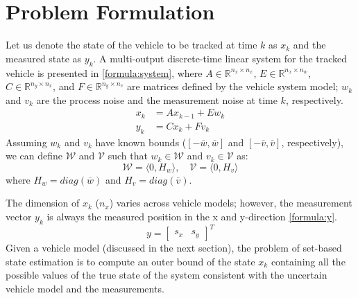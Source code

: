 \section{Problem Formulation}
Let us denote the state of the vehicle to be tracked at time $k$ as $x_k$ and the measured state as $y_k$. A multi-output discrete-time linear system for the tracked vehicle is presented in \eqref{formula:system}, where $A \in \mathbb{R} ^{n_x \times n_x}$, $E \in \mathbb{R} ^{n_x \times n_w}$, $C \in \mathbb{R} ^{n_y \times n_x}$, and $F \in \mathbb{R} ^{n_y \times n_v}$ are matrices defined by the vehicle system model; $w_k$ and $v_k$ are the process noise and the measurement noise at time $k$, respectively. 
\begin{equation}
\label{formula:system}
\begin{split}
x_{k} &= Ax_{k-1} + Ew_k\\
y_k &= Cx_k + Fv_k
\end{split}
\end{equation}
Assuming $w_k$ and $v_k$ have known bounds ($[-\overline{w}, \overline{w}]$ and $[-\overline{v}, \overline{v}]$, respectively), we can define $\mathcal{W}$ and $\mathcal{V}$ such that $w_k \in \mathcal{W}$ and $v_k \in \mathcal{V}$ as:
\begin{equation}
\label{formula:wv}
\mathcal{W} = \langle 0, H_w \rangle ,\quad \mathcal{V} = \langle 0, H_v \rangle
\end{equation}
where $H_w = diag(\overline{w})$ and $H_v= diag(\overline{v})$.


The dimension of $x_k$ ($n_x$) varies across vehicle models; however, the measurement vector $y_k$ is always the measured position in the x and y-direction \eqref{formula:y}.  
\begin{equation}
\label{formula:y}
y =[ 
\begin{matrix}
s_x & s_y
\end{matrix}
]^T
\end{equation}
Given a vehicle model (discussed in the next section), the problem of set-based state estimation is to compute an outer bound of the state $x_k$ containing all the possible values of the true state of the system consistent with the uncertain vehicle model and the measurements.

